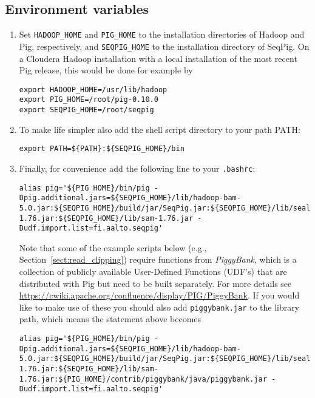 \subsection{Environment variables}
\label{sect:install_env}
\begin{enumerate}
\item Set {\tt HADOOP\_HOME} and {\tt PIG\_HOME} to the installation
directories of Hadoop and Pig, respectively, and {\tt SEQPIG\_HOME} to
the installation directory of SeqPig. On a Cloudera Hadoop installation
with a local installation of the most recent Pig release, this would be
done for example by
\begin{lstlisting} 
export HADOOP_HOME=/usr/lib/hadoop
export PIG_HOME=/root/pig-0.10.0
export SEQPIG_HOME=/root/seqpig 
\end{lstlisting}
%
\item To make life simpler also add the shell script directory to your path PATH:
%
\begin{lstlisting} 
export PATH=${PATH}:${SEQPIG_HOME}/bin
\end{lstlisting}
%
\item Finally, for convenience add the following line to your {\tt .bashrc}:
%
\begin{lstlisting} 
alias pig='${PIG_HOME}/bin/pig -Dpig.additional.jars=${SEQPIG_HOME}/lib/hadoop-bam-5.0.jar:${SEQPIG_HOME}/build/jar/SeqPig.jar:${SEQPIG_HOME}/lib/seal.jar:${SEQPIG_HOME}/lib/picard-1.76.jar:${SEQPIG_HOME}/lib/sam-1.76.jar -Dudf.import.list=fi.aalto.seqpig' 
\end{lstlisting}
%
Note that some of the example scripts below (e.g.,
Section~\ref{sect:read_clipping}) require functions from \emph{PiggyBank},
which is a collection of publicly available User-Defined Functions (UDF's)
that are distributed with Pig but need to be built separately.
For more details see
\url{https://cwiki.apache.org/confluence/display/PIG/PiggyBank}. If you would like to
make use of these you should also add {\tt piggybank.jar} to the library path, which
means the statement above becomes
\begin{lstlisting} 
alias pig='${PIG_HOME}/bin/pig -Dpig.additional.jars=${SEQPIG_HOME}/lib/hadoop-bam-5.0.jar:${SEQPIG_HOME}/build/jar/SeqPig.jar:${SEQPIG_HOME}/lib/seal.jar:${SEQPIG_HOME}/lib/picard-1.76.jar:${SEQPIG_HOME}/lib/sam-1.76.jar:${PIG_HOME}/contrib/piggybank/java/piggybank.jar -Dudf.import.list=fi.aalto.seqpig' 
\end{lstlisting}
\end{enumerate}

